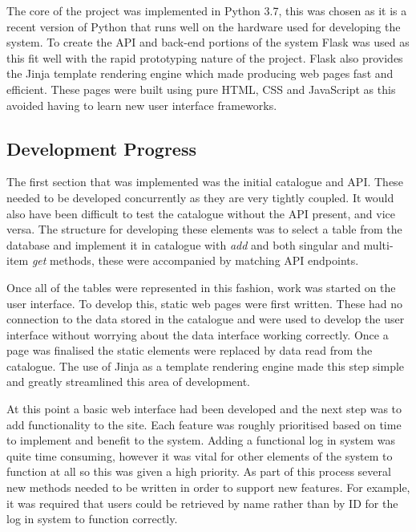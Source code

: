 \documentclass[12pt,titlepage]{article}
\begin{document}
  The core of the project was implemented in Python 3.7, this was chosen as it
  is a recent version of Python that runs well on the hardware used for
  developing the system. To create the API and back-end portions of the system
  Flask was used as this fit well with the rapid prototyping nature of the
  project. Flask also provides the Jinja template rendering engine which made
  producing web pages fast and efficient. These pages were built using pure
  HTML, CSS and JavaScript as this avoided having to learn new user interface
  frameworks.

  \subsection{Development Progress}

  The first section that was implemented was the initial catalogue and API.
  These needed to be developed concurrently as they are very tightly coupled. It
  would also have been difficult to test the catalogue without the API present,
  and vice versa. The structure for developing these elements was to select a
  table from the database and implement it in catalogue with \textit{add} and
  both singular and multi-item \textit{get} methods, these were accompanied by
  matching API endpoints.

  Once all of the tables were represented in this fashion, work was started on
  the user interface. To develop this, static web pages were first written.
  These had no connection to the data stored in the catalogue and were used to
  develop the user interface without worrying about the data interface working
  correctly. Once a page was finalised the static elements were replaced by data
  read from the catalogue. The use of Jinja as a template rendering engine made
  this step simple and greatly streamlined this area of development.

  At this point a basic web interface had been developed and the next step was
  to add functionality to the site. Each feature was roughly prioritised based
  on time to implement and benefit to the system. Adding a functional log in
  system was quite time consuming, however it was vital for other elements of
  the system to function at all so this was given a high priority. As part of
  this process several new methods needed to be written in order to support new
  features. For example, it was required that users could be retrieved by name
  rather than by ID for the log in system to function correctly.
\end{document}
